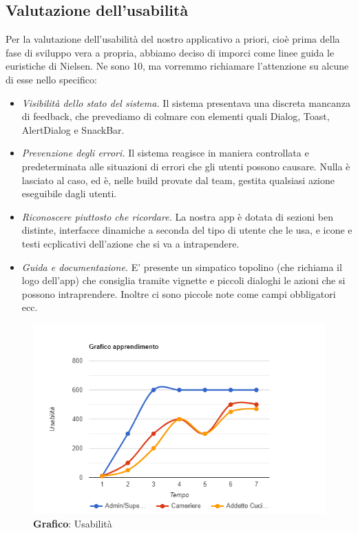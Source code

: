 \subsection{Valutazione dell'usabilità}

    \begin{flushleft}
       Per la valutazione dell'usabilità del nostro applicativo a priori, cioè prima della fase di sviluppo vera a propria,
       abbiamo deciso di imporci come linee guida le euristiche di Nielsen.
       Ne sono 10, ma vorremmo richiamare l'attenzione su alcune di esse nello specifico:
        \begin{itemize}
            \item  \emph{Visibilità dello stato del sistema.} Il sistema presentava una discreta mancanza di feedback, che prevediamo di colmare con elementi quali Dialog, Toast, AlertDialog e SnackBar.
            \item  \emph{Prevenzione degli errori.} Il sistema reagisce in maniera controllata e predeterminata alle situazioni di errori che gli utenti possono causare. Nulla è lasciato al caso, ed è, nelle build provate dal team, gestita qualsiasi azione eseguibile dagli utenti.
            \item  \emph{Riconoscere piuttosto che ricordare.} La nostra app è dotata di sezioni ben distinte, interfacce dinamiche a seconda del tipo di utente che le usa, e icone e testi ecplicativi dell'azione che si va a intrapendere.
            \item  \emph{Guida e documentazione.} E' presente un simpatico topolino (che richiama il logo dell'app) che consiglia tramite vignette e piccoli dialoghi le azioni che si possono intraprendere. Inoltre ci sono piccole note come campi obbligatori ecc.
        \end{itemize}
    \end{flushleft}

    \begin{figure}[H]
        \centering
        \includegraphics[scale=0.6]{assets/immagini varie/grafico usabilita.png}
        \caption{\textbf{Grafico}: Usabilità}\label{fig:Usabilità_graph}
    \end{figure}